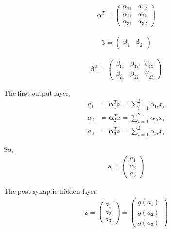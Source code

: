 \documentclass[12pt,a4paper]{article}%
\theoremstyle{definition}
\theoremstyle{plain}
\numberwithin{equation}{section}
\begin{document}
\begin{gather}
\boldsymbol{\alpha}^{T} = \begin{pmatrix}
  \alpha_{11} & \alpha_{12}  \\
  \alpha_{21} & \alpha_{22}  \\
  \alpha_{31} & \alpha_{32}
 \end{pmatrix}
\end{gather}

\begin{gather}
\boldsymbol{\beta} = \begin{pmatrix}
 \boldsymbol{\beta}_{1} & \boldsymbol{\beta}_{2} 
 \end{pmatrix}
\end{gather}

\begin{gather}
\boldsymbol{\beta}^{T} = \begin{pmatrix}
  \beta_{11} & \beta_{12} & \beta_{13} \\
  \beta_{21} & \beta_{22} & \beta_{23}
 \end{pmatrix}
\end{gather}

The first output layer,
\begin{align*}
a_{1} &= \boldsymbol{\alpha}_{1}^{T} x = \sum\limits_{i=1}^{2} \alpha_{1i}x_{i}  \\
a_{2} &= \boldsymbol{\alpha}_{2}^{T} x = \sum\limits_{i=1}^{2} \alpha_{2i}x_{i} \\
a_{3} &= \boldsymbol{\alpha}_{3}^{T} x = \sum\limits_{i=1}^{2} \alpha_{3i}x_{i}
\end{align*}

So, 
\begin{gather}
\mathbf{a} = \begin{pmatrix}
  a_{1} \\
  a_{2} \\
  a_{3}
 \end{pmatrix}
\end{gather}

The post-synaptic hidden layer
\begin{gather}
\mathbf{z} = \begin{pmatrix}
  z_{1} \\
  z_{2} \\
  z_{3}
 \end{pmatrix} = \begin{pmatrix}
  g(a_{1}) \\
  g(a_{2}) \\
  g(a_{3})
 \end{pmatrix}
\end{gather}
\end{document}
